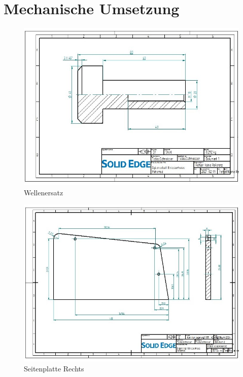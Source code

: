 \newpage

\section{Mechanische Umsetzung}

\begin{figure} [H]
	\begin{center}
		\includegraphics[angle=90, scale=0.9] {figures/mechanik/Welle_Rechts_Zeichnung.jpg}
		\caption{Wellenersatz}
		\label{fig:Wellenersatz1}
	\end{center}
\end{figure}

\newpage

\begin{figure} [H]
	\begin{center}
		\includegraphics[angle=90]{figures/mechanik/Seitenplatte_Fertigung_Rechts.jpg}
		\caption{Seitenplatte Rechts}
		\label{fig:SeitenplatteRechts}
	\end{center}
\end{figure}

